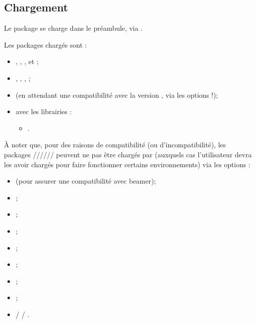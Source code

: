 \documentclass[french,11pt,a4paper]{article}
\begin{document}
\subsection{Chargement}

Le package se charge dans le préambule, via .

Les packages chargés sont :

\begin{itemize}
	\item {}, , ,  et  ;
	\item {}, , ,  ;
	\item {} (en attendant une compatibilité avec la version , via les options \MontreCode{[fa6] / [fa7]} !);
	\item {} avec les librairies :
	\begin{itemize}
		\item {}.
	\end{itemize}
\end{itemize}

À noter que, pour des raisons de compatibilité (ou d'incompatibilité), les packages ////// peuvent ne pas être chargés par  (auxquels cas l'utilisateur devra les avoir chargés pour faire fonctionner certains environnements) via les options :

\begin{itemize}
	\item {} (pour assurer une compatibilité avec \textsf{beamer});
	\item {} ;
	\item {} ;
	\item {} ;
	\item {} ;
	\item {} ;
	\item {} ;
	\item {} ;
	\item {} /   / .
\end{itemize}
\end{document}
